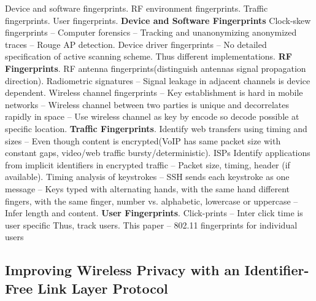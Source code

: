 \documentclass[9pt]{extarticle}
\begin{document}
\begin{multicols}{2}
Device and software fingerprints. RF environment fingerprints. Traffic fingerprints. User fingerprints. \textbf{Device and Software Fingerprints} Clock-skew fingerprints – Computer forensics – Tracking and unanonymizing anonymized traces – Rouge AP detection. Device driver fingerprints – No detailed specification of active scanning scheme. Thus different implementations. \textbf{RF Fingerprints}. RF antenna fingerprints(distinguish antennas signal propagation direction). Radiometric signatures – Signal leakage in adjacent channels is device dependent. Wireless channel fingerprints – Key establishment is hard in mobile networks – Wireless channel between two parties is unique and decorrelates rapidly in space – Use wireless channel as key by encode so decode possible at specific location. \textbf{Traffic Fingerprints}. Identify web transfers using timing and sizes – Even though content is encrypted(VoIP has same packet size with constant gaps, video/web traffic bursty/deterministic). ISPs Identify applications from implicit identifiers in encrypted traffic – Packet size, timing, header (if available). Timing analysis of keystrokes – SSH sends each keystroke as one message – Keys typed with alternating hands, with the same hand different fingers, with the same finger, number vs. alphabetic, lowercase or uppercase – Infer length and content. \textbf{User Fingerprints}. Click-prints – Inter click time is user specific Thus, track users. This paper – 802.11 fingerprints for individual users

\subsection{Improving Wireless Privacy with an Identifier-Free Link Layer Protocol}


\end{multicols}
\end{document}
